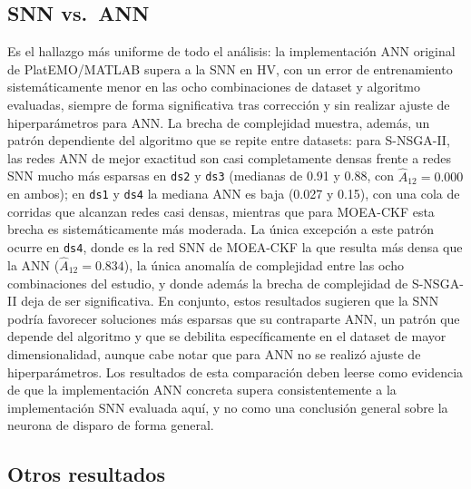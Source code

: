 \subsection{SNN vs.\ ANN}
\label{sec:discusion-estudio2}

Es el hallazgo más uniforme de todo el análisis: la implementación ANN original de PlatEMO/MATLAB supera a la SNN en HV, con un error de entrenamiento sistemáticamente menor en las ocho combinaciones de dataset y algoritmo evaluadas, siempre de forma significativa tras corrección y sin realizar ajuste de hiperparámetros para ANN. La brecha de complejidad muestra, además, un patrón dependiente del algoritmo que se repite entre datasets: para S-NSGA-II, las redes ANN de mejor exactitud son casi completamente densas frente a redes SNN mucho más esparsas en \texttt{ds2} y \texttt{ds3} (medianas de 0.91 y 0.88, con $\hat{A}_{12}=0.000$ en ambos); en \texttt{ds1} y \texttt{ds4} la mediana ANN es baja (0.027 y 0.15), con una cola de corridas que alcanzan redes casi densas, mientras que para MOEA-CKF esta brecha es sistemáticamente más moderada. La única excepción a este patrón ocurre en \texttt{ds4}, donde es la red SNN de MOEA-CKF la que resulta más densa que la ANN ($\hat{A}_{12}=0.834$), la única anomalía de complejidad entre las ocho combinaciones del estudio, y donde además la brecha de complejidad de S-NSGA-II deja de ser significativa. En conjunto, estos resultados sugieren que la SNN podría favorecer soluciones más esparsas que su contraparte ANN, un patrón que depende del algoritmo y que se debilita específicamente en el dataset de mayor dimensionalidad, aunque cabe notar que para ANN no se realizó ajuste de hiperparámetros. Los resultados de esta comparación deben leerse como evidencia de que la implementación ANN concreta supera consistentemente a la implementación SNN evaluada aquí, y no como una conclusión general sobre la neurona de disparo de forma general.

\subsection{Otros resultados}
\label{sec:discusion-otros}

